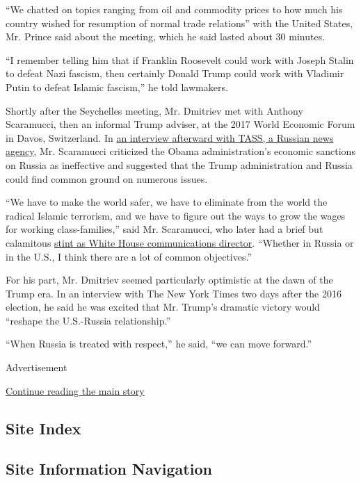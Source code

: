 ``We chatted on topics ranging from oil and commodity prices to how much
his country wished for resumption of normal trade relations'' with the
United States, Mr. Prince said about the meeting, which he said lasted
about 30 minutes.

``I remember telling him that if Franklin Roosevelt could work with
Joseph Stalin to defeat Nazi fascism, then certainly Donald Trump could
work with Vladimir Putin to defeat Islamic fascism,'' he told lawmakers.

Shortly after the Seychelles meeting, Mr. Dmitriev met with Anthony
Scaramucci, then an informal Trump adviser, at the 2017 World Economic
Forum in Davos, Switzerland. In
\href{https://www.rbth.com/news/2017/01/17/trumps-advisor-says-us-sanctions-against-russia-had-opposite-effect_682543}{an
interview afterward with TASS, a Russian news agency}, Mr. Scaramucci
criticized the Obama administration's economic sanctions on Russia as
ineffective and suggested that the Trump administration and Russia could
find common ground on numerous issues.

``We have to make the world safer, we have to eliminate from the world
the radical Islamic terrorism, and we have to figure out the ways to
grow the wages for working class-families,'' said Mr. Scaramucci, who
later had a brief but calamitous
\href{https://www.nytimes.com/2017/07/31/us/politics/trump-white-house-obamacare-health.html}{stint
as White House communications director}. ``Whether in Russia or in the
U.S., I think there are a lot of common objectives.''

For his part, Mr. Dmitriev seemed particularly optimistic at the dawn of
the Trump era. In an interview with The New York Times two days after
the 2016 election, he said he was excited that Mr. Trump's dramatic
victory would ``reshape the U.S.-Russia relationship.''

``When Russia is treated with respect,'' he said, ``we can move
forward.''

Advertisement

\protect\hyperlink{after-bottom}{Continue reading the main story}

\hypertarget{site-index}{%
\subsection{Site Index}\label{site-index}}

\hypertarget{site-information-navigation}{%
\subsection{Site Information
Navigation}\label{site-information-navigation}}

